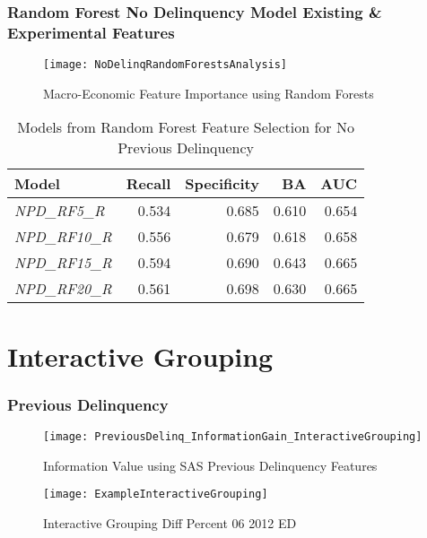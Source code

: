 \subsubsection{Random Forest No Delinquency Model Existing \& Experimental Features}

\begin{figure}[H]
	\texttt{[image: NoDelinqRandomForestsAnalysis]}
	\caption{Macro-Economic Feature Importance using Random Forests}
	\label{fig:NoDelinqRandomForestsAnalysis}
\end{figure}


\begin{table}[H]
\centering
\small
		\begin{tabular}{l  r r r r}
			\hline
			\textbf{Model}  & \textbf{Recall} & \textbf{Specificity} & \textbf{BA} & \textbf{AUC}  \\ \hline
			\textit{NPD\_RF5\_R}  & 0.534 & 0.685 & 0.610 & 0.654   \\ 
			\textit{NPD\_RF10\_R} & 0.556 & 0.679 & 0.618 & 0.658  \\ 
			\textit{NPD\_RF15\_R} & 0.594 & 0.690 & 0.643 & 0.665  \\
			\textit{NPD\_RF20\_R} & 0.561 & 0.698 & 0.630 & 0.665  \\\hline 
		\end{tabular}

	\caption{Models from Random Forest Feature Selection for No Previous Delinquency}
	\label{table:RFNPDModelResults}
\end{table}


\section{Interactive Grouping}

\subsubsection{Previous Delinquency}
\begin{figure}[H]
	\texttt{[image: PreviousDelinq\_InformationGain\_InteractiveGrouping]}
	\caption{Information Value using SAS Previous Delinquency Features}
	\label{fig:Information Value using SAS Previous Delinquency Features}
\end{figure}

\begin{figure}[H]
	\texttt{[image: ExampleInteractiveGrouping]}
	\caption{Interactive Grouping Diff Percent 06 2012 ED}
	\label{fig:Interactive Grouping Diff Percent 06 2012 ED}
\end{figure}


